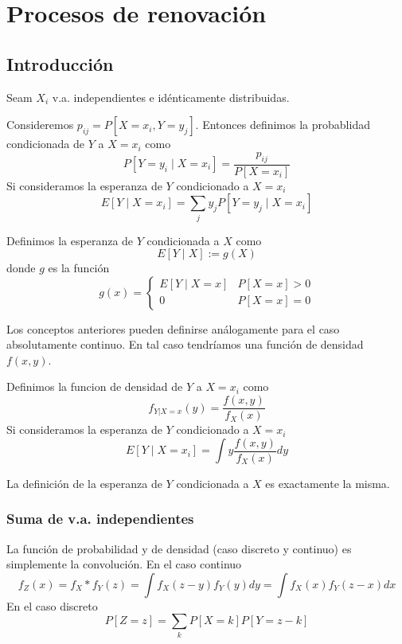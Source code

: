\documentclass[PREyA.tex]{subfiles}
\begin{document}
\chapter{Procesos de renovación}
\section{Introducción}
\begin{defi}Seam $X_i$ v.a. independientes e idénticamente distribuidas.
\end{defi}
\begin{defi}
Consideremos $p_{ij}=P[X=x_i,Y=y_j]$. Entonces definimos la probablidad condicionada de $Y$ a $X=x_i$ como
$$
P[Y=y_i \mid X=x_i] = \frac{p_{ij}}{P[X=x_i]}
$$
Si consideramos la esperanza de $Y$ condicionado a $X=x_i$ 
$$
E[Y\mid X=x_i] = \sum_j y_j P[Y=y_j \mid X=x_i]
$$
\end{defi}
\begin{defi}
Definimos la esperanza de $Y$ condicionada a $X$ como
$$
E[Y\mid X]:= g(X)
$$
donde $g$ es la función
$$
g(x)=\begin{cases}
E[Y\mid X=x] & P[X=x]>0\\
0 & P[X=x]=0
\end{cases}
$$
\end{defi}
Los conceptos anteriores pueden definirse análogamente para el caso absolutamente continuo. En tal caso tendríamos una función de densidad $f(x,y)$.
\begin{defi}
Definimos la funcion de densidad de $Y$ a $X=x_i$ como
$$
f_{Y|X=x}(y)=\frac{f(x,y)}{f_X(x)}
$$
Si consideramos la esperanza de $Y$ condicionado a $X=x_i$ 
$$
E[Y\mid X=x_i] = \int y \frac{f(x,y)}{f_X(x)} dy
$$
\end{defi}
La definición de la esperanza de $Y$ condicionada a $X$ es exactamente la misma.
\subsection{Suma de v.a. independientes}
La función de probabilidad y de densidad (caso discreto y continuo) es simplemente la convolución. En el caso continuo
$$
f_Z(x)=f_X * f_Y (z) = \int f_X(z-y)f_Y(y)dy = \int f_X(x)f_Y(z-x)dx
$$
En el caso discreto
$$
P[Z=z] = \sum_k P[X=k]P[Y=z-k]

$$
\end{document}
